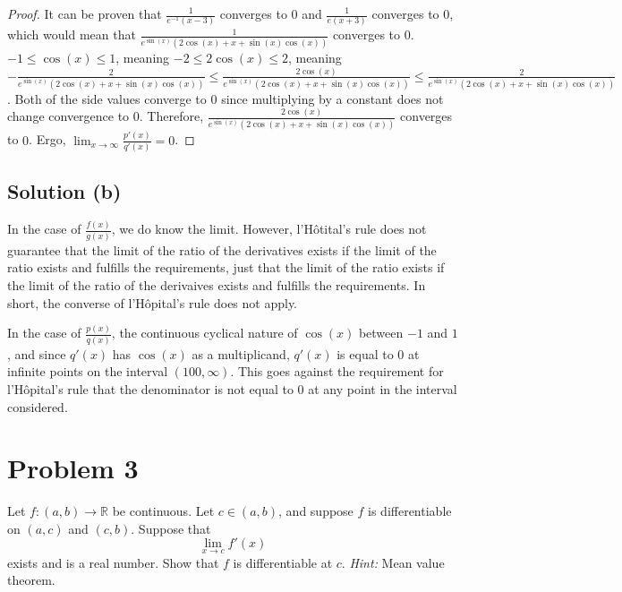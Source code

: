 \documentclass[11pt]{article}
\begin{document}
\begin{proof}
            It can be proven that $\frac{1}{e^{-1} \left( x - 3 \right)}$ converges to $0$ and $\frac{1}{e\left( x + 3 \right)}$ converges to $0$, which would mean that $\frac{1}{e^{\sin(x)} \left( 2\cos(x) + x + \sin(x) \cos(x) \right)}$ converges to $0$.
            $-1 \leq \cos(x) \leq 1$, meaning $-2 \leq 2\cos(x) \leq 2$, meaning $-\frac{2}{e^{\sin(x)} \left( 2\cos(x) + x + \sin(x) \cos(x) \right)} \leq \frac{2\cos(x)}{e^{\sin(x)} \left( 2\cos(x) + x + \sin(x) \cos(x) \right)} \leq \frac{2}{e^{\sin(x)} \left( 2\cos(x) + x + \sin(x) \cos(x) \right)}$.
            Both of the side values converge to $0$ since multiplying by a constant does not change convergence to $0$.
            Therefore, $\frac{2\cos(x)}{e^{\sin(x)} \left( 2\cos(x) + x + \sin(x) \cos(x) \right)}$ converges to $0$.
            Ergo, $\lim_{x \to \infty} \frac{p'(x)}{q'(x)} = 0$.
        \end{proof}

    \subsection{Solution (b)}
        In the case of $\frac{f(x)}{g(x)}$, we do know the limit.
        However, l'H\^otital's rule does not guarantee that the limit of the ratio of the derivatives exists if the limit of the ratio exists and fulfills the requirements, just that the limit of the ratio exists if the limit of the ratio of the derivaives exists and fulfills the requirements.
        In short, the converse of l'H\^opital's rule does not apply.

        In the case of $\frac{p(x)}{q(x)}$, the continuous cyclical nature of $\cos(x)$ between $-1$ and $1$, and since $q'(x)$ has $\cos(x)$ as a multiplicand, $q'(x)$ is equal to $0$ at infinite points on the interval $(100, \infty)$.
        This goes against the requirement for l'H\^opital's rule that the denominator is not equal to $0$ at any point in the interval considered.

\pagebreak
\section{Problem 3}
    Let $f : (a, b) \to \mathbb{R}$ be continuous. Let $c \in (a, b)$, and suppose $f$ is differentiable on $(a, c)$ and $(c, b)$. Suppose that 
    \begin{equation*}
        \lim_{x \to c} f'(x)
    \end{equation*}
    exists and is a real number. Show that $f$ is differentiable at $c$. \textit{Hint:} Mean value theorem.
\end{document}
